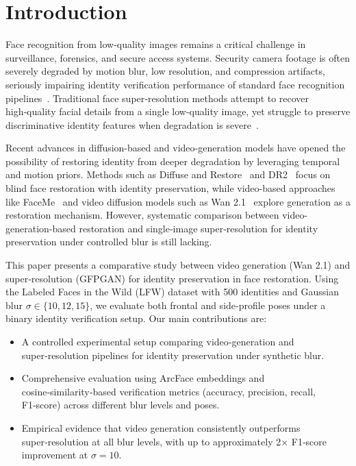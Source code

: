 \documentclass{ieeeaccess}
\begin{document}
\section{Introduction}
\label{sec:introduction}

Face recognition from low-quality images remains a critical challenge in surveillance, forensics, and secure access systems. Security camera footage is often severely degraded by motion blur, low resolution, and compression artifacts, seriously impairing identity verification performance of standard face recognition pipelines~\cite{Survey2021}. Traditional face super‑resolution methods attempt to recover high‑quality facial details from a single low‑quality image, yet struggle to preserve discriminative identity features when degradation is severe~\cite{EIPNet,DR2}.

Recent advances in diffusion-based and video-generation models have opened the possibility of restoring identity from deeper degradation by leveraging temporal and motion priors. Methods such as Diffuse and Restore~\cite{DiffuseRestore} and DR2~\cite{DR2} focus on blind face restoration with identity preservation, while video-based approaches like FaceMe~\cite{FaceMe2025} and video diffusion models such as Wan 2.1~\cite{Wan2_1} explore generation as a restoration mechanism. However, systematic comparison between video-generation-based restoration and single‑image super‑resolution for identity preservation under controlled blur is still lacking.

This paper presents a comparative study between video generation (Wan 2.1) and super‑resolution (GFPGAN) for identity preservation in face restoration. Using the Labeled Faces in the Wild (LFW) dataset with 500 identities and Gaussian blur $\sigma \in \{10, 12, 15\}$, we evaluate both frontal and side‑profile poses under a binary identity verification setup. Our main contributions are:

\begin{itemize}
    \item A controlled experimental setup comparing video‑generation and super‑resolution pipelines for identity preservation under synthetic blur.
    \item Comprehensive evaluation using ArcFace embeddings and cosine‑similarity‑based verification metrics (accuracy, precision, recall, F1‑score) across different blur levels and poses.
    \item Empirical evidence that video generation consistently outperforms super‑resolution at all blur levels, with up to approximately 2× F1‑score improvement at $\sigma=10$.
\end{itemize}
\end{document}
